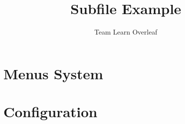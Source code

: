 \documentclass{article}
\title{Subfile Example}
\author{Team Learn Overleaf}
\date{ }
\begin{document}
 
\maketitle
 
\section{Menus System}

 
\section{Configuration}

 
\end{document}
